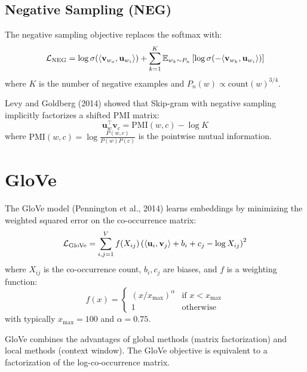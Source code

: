 \subsection{Negative Sampling (NEG)}

\begin{definition}
The negative sampling objective replaces the softmax with:
\[
\mathcal{L}_{\text{NEG}} = \log \sigma(\langle \mathbf{v}_{w_o}, \mathbf{u}_{w_i} \rangle) + \sum_{k=1}^{K} \mathbb{E}_{w_k \sim P_n} \left[\log \sigma(-\langle \mathbf{v}_{w_k}, \mathbf{u}_{w_i} \rangle)\right]
\]
where $K$ is the number of negative examples and $P_n(w) \propto \text{count}(w)^{3/4}$.
\end{definition}

\begin{theorem}
\label{thm:neg-pmi}
Levy and Goldberg (2014) showed that Skip-gram with negative sampling
implicitly factorizes a shifted PMI matrix:
\[
\mathbf{u}_w^\top \mathbf{v}_c = \text{PMI}(w, c) - \log K
\]
where $\text{PMI}(w, c) = \log \frac{P(w, c)}{P(w) P(c)}$ is the pointwise
mutual information.
\end{theorem}

\section{GloVe}
\label{sec:emb:glove}

\begin{definition}[GloVe]
The GloVe model (Pennington et al., 2014) learns embeddings by minimizing the
weighted squared error on the co-occurrence matrix:
\[
\mathcal{L}_{\text{GloVe}} = \sum_{i,j=1}^{V} f(X_{ij}) \left(\langle \mathbf{u}_i, \mathbf{v}_j \rangle + b_i + c_j - \log X_{ij}\right)^2
\]
where $X_{ij}$ is the co-occurrence count, $b_i, c_j$ are biases, and $f$ is a
weighting function:
\[
f(x) = \begin{cases}
(x / x_{\max})^\alpha & \text{if } x < x_{\max} \\
1 & \text{otherwise}
\end{cases}
\]
with typically $x_{\max} = 100$ and $\alpha = 0.75$.
\end{definition}

\begin{remark}
GloVe combines the advantages of global methods (matrix factorization) and
local methods (context window). The GloVe objective is equivalent to a
factorization of the log-co-occurrence matrix.
\end{remark}


